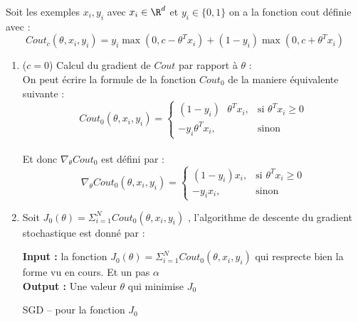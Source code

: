\documentclass[12pt]{article}
\begin{document}
Soit les exemples $x_i,y_i$ avec $x_i \in \R^d$ et $y_i \in \{0,1\}$ on a la fonction cout définie avec :
\begin{equation}
    Cout_c(\theta,x_i,y_i) = y_i \max(0,c-\theta^Tx_i) + (1-y_i) \max(0,c+\theta^Tx_i)
    \label{eq:e1}
\end{equation}
\begin{enumerate}[1)]
    \item ($c=0$) Calcul du gradient de $Cout$ par rapport à $\theta$ : 
     \\
     On peut écrire la formule de la fonction $Cout_0$ de la maniere équivalente suivante :
     $$
     Cout_0(\theta,x_i,y_i) =
     \begin{cases}
         (1-y_i)\mbox{ }\theta^Tx_i, & \mbox{si } \theta^Tx_i \geq 0 \\
         -y_i\theta^Tx_i, & \mbox{sinon } 
     \end{cases}
     $$\\
     Et donc $\nabla_\theta Cout_0$ est défini par : 
          $$
     \nabla_\theta Cout_0(\theta,x_i,y_i) =
     \begin{cases}
         (1-y_i) x_i, & \mbox{si } \theta^Tx_i \geq 0 \\
         -y_i x_i, & \mbox{sinon } 
     \end{cases}
     $$
     \item Soit $J_0(\theta) = \Sigma_{i=1}^N Cout_0(\theta,x_i,y_i)$ , l'algorithme de descente du gradient stochastique est donné par : \\
    \begin{algorithm}[H]
    \SetAlgoLined
     \textbf{Input :} la fonction $J_0(\theta) = \Sigma_{i=1}^N Cout_0(\theta,x_i,y_i)$ qui resprecte bien la forme vu en cours. Et un pas $\alpha$ \\
    \textbf{Output :} Une valeur $\theta$ qui minimise $J_0$\\
      \caption{SGD -- pour la fonction $J_0$}
    \end{algorithm}\leavevmode\newline 
    \clearpage

\end{enumerate}
\end{document}
